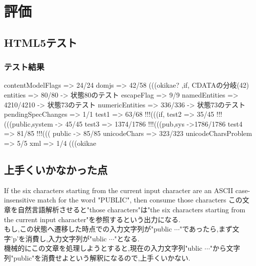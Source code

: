 \documentclass[uplatex,a4j]{jsreport}
\begin{document}
\chapter{評価}
\section{HTML5テスト}
\subsection*{テスト結果}
contentModelFlags => 24/24
domjs => 42/58 (((okikae? ,if, CDATAの分岐(42)
 entities => 80/80 -> 状態80のテスト
 escapeFlag => 9/9
 namedEntities => 4210/4210 -> 状態73のテスト
 numericEntities => 336/336 -> 状態73のテスト
 pendingSpecChanges => 1/1
test1 => 63/68  !!!(((if,
 test2 => 35/45  !!!(((public,system -> 45/45
 test3 => 1374/1786  !!!(((pub,sys ->1786/1786
 test4 => 81/85  !!!((( public  -> 85/85
 unicodeChars => 323/323
 unicodeCharsProblem => 5/5
xml => 1/4  (((okikae
\section{上手くいかなかった点}
If the six characters starting from the current input character are an ASCII case-insensitive match for the word "PUBLIC", then consume those characters
この文章を自然言語解析させると"those characters"は"the six characters starting from the current input character"を参照するという出力になる.\\
もし,この状態へ遷移した時点での入力文字列が"public $\cdots$"であったら,まず文字'p'を消費し,入力文字列が"ublic $\cdots$"となる.\\
機械的にこの文章を処理しようとすると,現在の入力文字列"ublic $\cdots$"から文字列"public"を消費せよという解釈になるので,上手くいかない.\\
\end{document}

